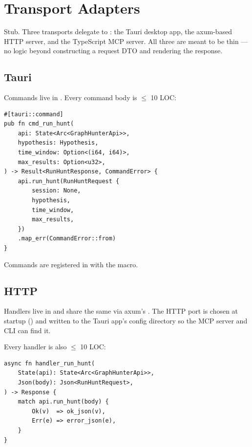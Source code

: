 \chapter{Transport Adapters}
\label{ch:transports}

\begin{note}
Stub. Three transports delegate to : the Tauri
desktop app, the axum-based HTTP server, and the TypeScript MCP
server. All three are meant to be thin --- no logic beyond
constructing a request DTO and rendering the response.
\end{note}

\section{Tauri}

Commands live in .
Every command body is $\leq$ 10 LOC:

\begin{lstlisting}[style=rust]
#[tauri::command]
pub fn cmd_run_hunt(
    api: State<Arc<GraphHunterApi>>,
    hypothesis: Hypothesis,
    time_window: Option<(i64, i64)>,
    max_results: Option<u32>,
) -> Result<RunHuntResponse, CommandError> {
    api.run_hunt(RunHuntRequest {
        session: None,
        hypothesis,
        time_window,
        max_results,
    })
    .map_err(CommandError::from)
}
\end{lstlisting}

Commands are registered in  with
the  macro.

\section{HTTP}

Handlers live in
 and share the same
 via axum's . The HTTP port
is chosen at startup () and written
to the Tauri app's config directory so the MCP server and CLI can
find it.

Every handler is also $\leq$ 10 LOC:

\begin{lstlisting}[style=rust]
async fn handler_run_hunt(
    State(api): State<Arc<GraphHunterApi>>,
    Json(body): Json<RunHuntRequest>,
) -> Response {
    match api.run_hunt(body) {
        Ok(v)  => ok_json(v),
        Err(e) => error_json(e),
    }
}
\end{lstlisting}

